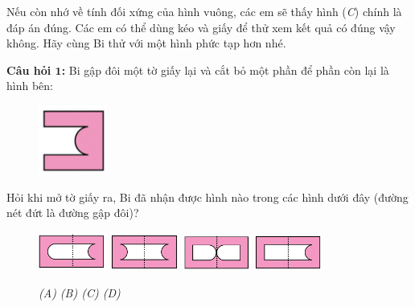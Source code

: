 Nếu còn nhớ về  tính đối xứng của hình vuông, các em sẽ thấy hình (\textit{C}) chính là đáp án đúng. Các em có thể dùng kéo và giấy để thử xem kết quả có đúng vậy không. Hãy cùng Bi thử với một hình phức tạp hơn nhé.
\vskip 0.1cm
\begin{multicols}{2}
	\textbf{\color{toancuabi}Câu hỏi $\pmb{1}$:} Bi gập đôi một tờ giấy lại và cắt bỏ một phần để phần còn lại là hình bên:
	
	\columnbreak
	\begin{figure}[H]
		\centering
		\captionsetup{labelformat=empty}
		\vspace*{-5pt}
		\captionsetup{justification=centering}
		\includegraphics[width =0.2\textwidth]{cat-3}
		\vspace*{-10pt}
	\end{figure}
\end{multicols}
Hỏi khi mở tờ giấy ra, Bi đã nhận được hình nào trong các hình dưới đây (đường nét đứt là đường gập đôi)?
\begin{figure}[H]
	\centering
	\captionsetup{labelformat=empty}
	\vspace*{-5pt}
	\captionsetup{justification=centering}
	\includegraphics[width =0.2\textwidth]{cat-3a}\quad
	\includegraphics[width =0.2\textwidth]{cat-3b}\quad
	\includegraphics[width =0.2\textwidth]{cat-3c}\quad
	\includegraphics[width =0.2\textwidth]{cat-3d}
	\caption{\small\textit{(A) \hspace*{55pt} (B) \hspace*{55pt}(C) \hspace*{55pt} (D)}}
	\vspace*{-10pt}
\end{figure}
